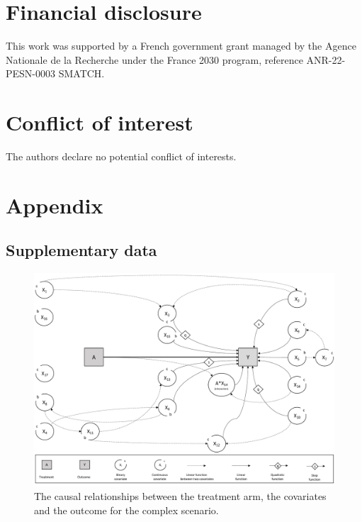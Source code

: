 \documentclass{article}
\begin{document}
\section*{Financial disclosure}
This work was supported by a French government grant managed by the Agence Nationale de la Recherche under the France 2030 program, reference ANR-22-PESN-0003 SMATCH.

\section*{Conflict of interest}
The authors declare no potential conflict of interests.




\clearpage


\section*{Appendix}


\subsection*{Supplementary data}


\begin{figure}[h]
\centerline{\includegraphics[width=\textwidth]{figures/DAGcomplexe.pdf}}
\caption{The causal relationships between the treatment arm, the covariates and the outcome for the complex scenario.\label{fig1}}
\end{figure}
\end{document}
